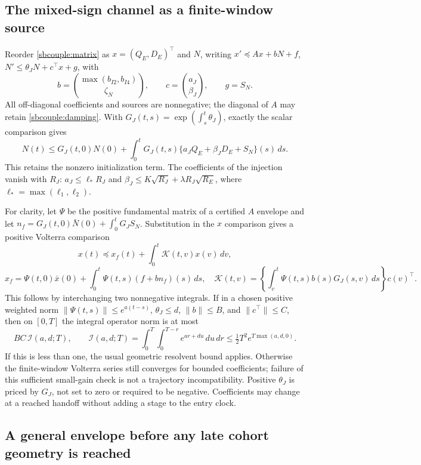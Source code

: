 \documentclass{article} %
\theoremstyle{plain}
\theoremstyle{definition}
\theoremstyle{remark}
\begin{document}
\subsection{The mixed-sign channel as a finite-window source}

Reorder \eqref{sbcouple:matrix} as $x=(Q_E,D_E)^\top$ and $N$, writing
$x'\preceq A x+bN+f$, $N'\le\theta_JN+c^\top x+g$, with
\[
 b=\binom{\max(b_{I2},b_{I4})}{\zeta_N},\qquad
 c=\binom{a_J}{\beta_J},\qquad g=S_N.
\]
All off-diagonal coefficients and sources are nonnegative; the diagonal
of $A$ may retain \eqref{sbcouple:damping}. With
$G_J(t,s)=\exp(\int_s^t\theta_J)$, exactly the scalar comparison gives
\begin{equation}\label{sbwindow:N-duhamel}
 N(t)\le G_J(t,0)N(0)+\int_0^tG_J(t,s)
                    \{a_JQ_E+\beta_JD_E+S_N\}(s)\,ds.
\end{equation}
This retains the nonzero initialization term. The coefficients of the
injection vanish with $R_J$: $a_J\le\ell_*R_J$ and
$\beta_J\le K\sqrt{R_J}+\lambda R_J\sqrt{R_E}$, where
$\ell_*=\max(\ell_1,\ell_2)$.

For clarity, let $\Psi$ be the positive fundamental matrix of a certified
$A$ envelope and let $n_f=G_J(t,0)\bar N(0)+\int_0^tG_JS_N$.
Substitution in the $x$ comparison gives a positive Volterra comparison
\[
 x(t)\preceq x_f(t)+\int_0^t\mathcal K(t,v)x(v)\,dv,
\]
\[
 x_f=\Psi(t,0)\bar x(0)+\int_0^t\Psi(t,s)(f+b n_f)(s)\,ds,
 \quad
 \mathcal K(t,v)=\left\{\int_v^t\Psi(t,s)b(s)G_J(s,v)\,ds\right\}c(v)^\top.
\]
This follows by interchanging two nonnegative integrals. If in a chosen
positive weighted norm $\|\Psi(t,s)\|\le e^{a(t-s)}$,
$\theta_J\le d$, $\|b\|\le B$, and $\|c^\top\|\le C$, then on
$[0,T]$ the integral operator norm is at most
\[
 BC\,\mathcal I(a,d;T),\qquad
 \mathcal I(a,d;T)=\int_0^T\int_0^{T-r}e^{ar+du}\,du\,dr
 \le\tfrac12T^2 e^{T\max(a,d,0)}.
\]
If this is less than one, the usual geometric resolvent bound applies.
Otherwise the finite-window Volterra series still converges for bounded
coefficients; failure of this sufficient small-gain check is not a
trajectory incompatibility. Positive $\theta_J$ is priced by $G_J$, not
set to zero or required to be negative. Coefficients may change at a
reached handoff without adding a stage to the entry clock.

\subsection{A general envelope before any late cohort geometry is reached}
\end{document}
